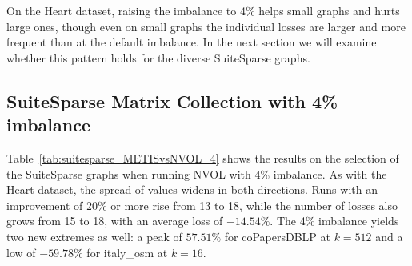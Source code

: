 On the Heart dataset, raising the imbalance to 4\% helps small graphs and hurts large ones, though even on small graphs the individual losses are larger and more frequent than at the default imbalance. In the next section we will examine whether this pattern holds for the diverse SuiteSparse graphs. 

\subsection{SuiteSparse Matrix Collection with 4\% imbalance}
Table~\ref{tab:suitesparse_METISvsNVOL_4} shows the results on the selection of the SuiteSparse graphs when running NVOL with 4\% imbalance. As with the Heart dataset, the spread of values widens in both directions. Runs with an improvement of 20\% or more rise from 13 to 18, while the number of losses also grows from 15 to 18, with an average loss of $-14.54\%$. The 4\% imbalance yields two new extremes as well: a peak of $57.51\%$ for coPapersDBLP at $k=512$ and a low of $-59.78\%$ for italy\_osm at $k=16$.


